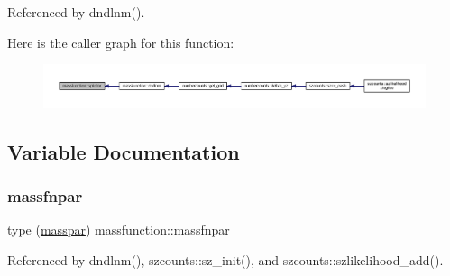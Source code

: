 Referenced by dndlnm().

Here is the caller graph for this function\+:
\nopagebreak
\begin{figure}[H]
\begin{center}
\leavevmode
\includegraphics[width=350pt]{namespacemassfunction_a64c53fdad2880885e6d900d266bd160e_icgraph}
\end{center}
\end{figure}


\subsection{Variable Documentation}
\mbox{\label{namespacemassfunction_ac3284bedbb7a589297bf6557a10e6f30}} 
\subsubsection{\texorpdfstring{massfnpar}{massfnpar}}
{\footnotesize\ttfamily type (\mbox{\hyperlink{structmassfunction_1_1masspar}{masspar}}) massfunction\+::massfnpar}



Referenced by dndlnm(), szcounts\+::sz\+\_\+init(), and szcounts\+::szlikelihood\+\_\+add().

